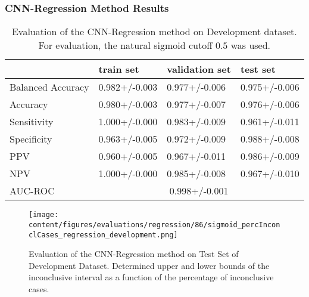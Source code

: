 \subsubsection{CNN-Regression Method Results}
\label{subsubsec:eval_regression}





\begin{table}[ht]
  \caption{Evaluation of the CNN-Regression method on Development dataset. 
  For evaluation, the natural sigmoid cutoff $0.5$ was used.}
  \centering
  \begin{tabular}{llll}
      \hline
                        & train set         & validation set      & test set             \\
      \hline
      Balanced Accuracy & 0.982+/-0.003   &  0.977+/-0.006    &  0.975+/-0.006 \\
      Accuracy          & 0.980+/-0.003     &   0.977+/-0.007   &  0.976+/-0.006  \\
      Sensitivity       &  1.000+/-0.000   &   0.983+/-0.009   &  0.961+/-0.011 \\
      Specificity       &   0.963+/-0.005  &   0.972+/-0.009 &   0.988+/-0.008 \\
      PPV               &  0.960+/-0.005    &   0.967+/-0.011  &  0.986+/-0.009  \\
      NPV               &  1.000+/-0.000  &   0.985+/-0.008   & 0.967+/-0.010 \\
      \hline
      AUC-ROC          &  \multicolumn{3}{c}{0.998+/-0.001}  \\
      \hline
  \end{tabular}
 \label{t1:cnn_regression_perf_eval_table}
\end{table}


\begin{figure}[t]
  \centering
  \texttt{[image: content/figures/evaluations/regression/86/sigmoid\_percInconclCases\_regression\_development.png]}
  \caption{Evaluation of the CNN-Regression method on Test Set of Development Dataset. 
  Determined upper and lower bounds of the inconclusive interval as a function of the percentage of inconclusive cases.} 
  \label{fig:regression_percInconclCases_development}
\end{figure}



